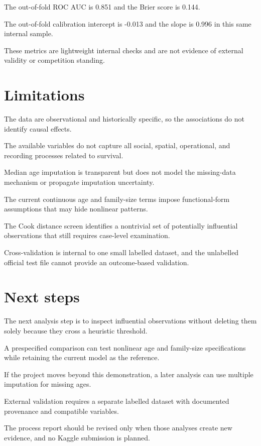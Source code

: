 \documentclass[preprint,12pt,authoryear]{elsarticle}
\begin{document}
The out-of-fold ROC AUC is 0.851 and the Brier score is 0.144.

The out-of-fold calibration intercept is -0.013 and the slope is 0.996 in this same internal sample.

These metrics are lightweight internal checks and are not evidence of external validity or competition standing.



\section{Limitations}

The data are observational and historically specific, so the associations do not identify causal effects.

The available variables do not capture all social, spatial, operational, and recording processes related to survival.

Median age imputation is transparent but does not model the missing-data mechanism or propagate imputation uncertainty.

The current continuous age and family-size terms impose functional-form assumptions that may hide nonlinear patterns.

The Cook distance screen identifies a nontrivial set of potentially influential observations that still requires case-level examination.

Cross-validation is internal to one small labelled dataset, and the unlabelled official test file cannot provide an outcome-based validation.

\section{Next steps}

The next analysis step is to inspect influential observations without deleting them solely because they cross a heuristic threshold.

A prespecified comparison can test nonlinear age and family-size specifications while retaining the current model as the reference.

If the project moves beyond this demonstration, a later analysis can use multiple imputation for missing ages.

External validation requires a separate labelled dataset with documented provenance and compatible variables.

The process report should be revised only when those analyses create new evidence, and no Kaggle submission is planned.
\end{document}
